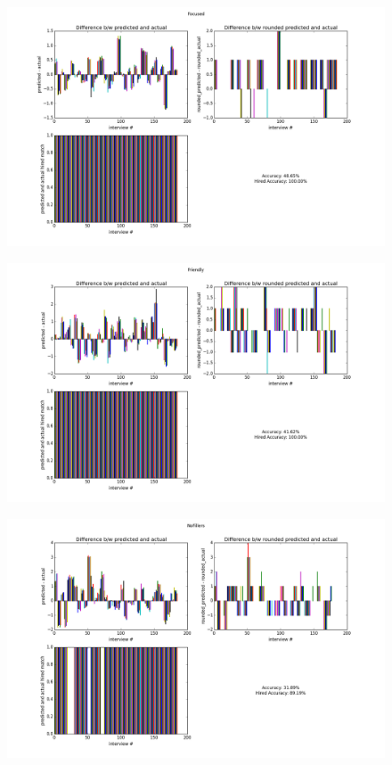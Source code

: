 \documentclass[11pt]{article}
\begin{document}
\begin{figure}[H]
\begin{center}
\includegraphics[width=1\columnwidth]{figures2/Focused.png}
\end{center}
\end{figure}

\begin{figure}[H]
\begin{center}
\includegraphics[width=1\columnwidth]{figures2/Friendly.png}
\end{center}
\end{figure}

\begin{figure}[H]
\begin{center}
\includegraphics[width=1\columnwidth]{figures2/NoFillers.png}
\end{center}
\end{figure}
\end{document}
